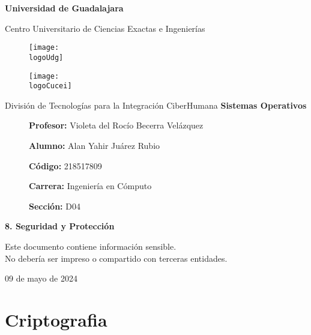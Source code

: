 \documentclass[12pt, a4paper]{article} %
\title{\theTitle}
\author{\theAuthor}
\newcommand{\logoUdg}{../../../../attachments/images/portada-udg.jpeg}
\newcommand{\logoCucei}{../../../../attachments/images/portada-cucei.jpeg}
\newcommand{\materia}{Sistemas Operativos}
\newcommand{\theTitle}{8. Seguridad y Protección}
\newcommand{\profesor}{Violeta del Rocío Becerra Velázquez}
\newcommand{\theAuthor}{Alan Yahir Juárez Rubio}
\newcommand{\code}{218517809}
\newcommand{\carrera}{Ingeniería en Cómputo}
\newcommand{\seccion}{D04}
\newcommand{\startDate}{09 de mayo de 2024}
\newcommand{\nl}{\par\vspace{0.4cm}}
\begin{document}
\cfoot{\ifodd\value{page}\else\thepage\fi} %

\begin{titlepage}
	\centering
	{\huge\textbf{Universidad de Guadalajara}}\par\vspace{0.6cm}
	{\LARGE{Centro Universitario de Ciencias Exactas e Ingenierías}}\vfill
	
	\begin{figure}[h]
		\begin{minipage}[t]{0.45\textwidth}
			\centering
			\texttt{[image: \\logoUdg]}
		\end{minipage}
		\hfill
		\begin{minipage}[t]{0.45\textwidth}
			\centering
			\texttt{[image: \\logoCucei]}
		\end{minipage}
	\end{figure}\vfill
	
	{\Large{División de Tecnologías para la Integración CiberHumana}}\vfill
	{\Large\textbf{\materia}}\vfill
	\begin{figure}[h]
		\centering
		\begin{minipage}[t]{0.75\textwidth}
			{\Large
				\textbf{Profesor:} \profesor\nl
				\textbf{Alumno:} \theAuthor\nl
				\textbf{Código:} \code\nl
				\textbf{Carrera:} \carrera\nl
				\textbf{Sección:} \seccion
			}
		\end{minipage}
	\end{figure}\vfill
	{\LARGE{\textbf{\theTitle}}}\vfill
	
	\begin{tcolorbox}[colback=red!5!white, colframe=red!75!black]
		\centering
		Este documento contiene información sensible.\\
		No debería ser impreso o compartido con terceras entidades.
	\end{tcolorbox}\vfill
	{\large \startDate}\par
\end{titlepage}

\clearpage
\tableofcontents

	

\clearpage
\section{Criptografia}
\end{document}
